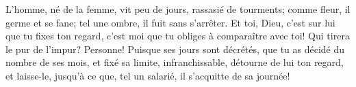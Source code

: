L’homme, né de la femme, vit peu de jours, rassasié de tourments;
	comme fleur, il germe et se fane;
	tel une ombre, il fuit sans s’arrêter.
Et toi, Dieu, c’est sur lui que tu fixes ton regard,
	c’est moi que tu obliges à comparaître avec toi!
Qui tirera le pur de l’impur? Personne!
Puisque ses jours sont décrétés,
	que tu as décidé du nombre de ses mois, et fixé sa limite, infranchissable,
	détourne de lui ton regard, et laisse-le,
	jusqu’à ce que, tel un salarié, il s’acquitte de sa journée!
